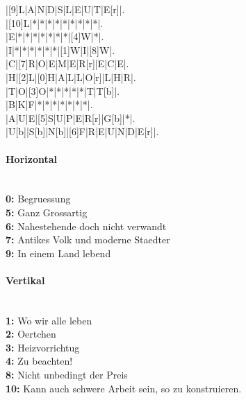 \begin{Puzzle}{10}{10}%
|[9]L|A|N|D|S|L|E|U|T|E[r]|.\\
|[10]L|*|*|*|*|*|*|*|*|*|.\\
|E|*|*|*|*|*|*|*|[4]W|*|.\\
|I|*|*|*|*|*|*|[1]W|I|[8]W|.\\
|C|[7]R|O|E|M|E|R[r]|E|C|E|.\\
|H|[2]L|[0]H|A|L|L|O[r]|L|H|R|.\\
|T|O|[3]O|*|*|*|*|*|T|T[b]|.\\
|B|K|F|*|*|*|*|*|*|*|.\\
|A|U|E|[5]S|U|P|E|R[r]|G[b]|*|.\\
|U[b]|S[b]|N[b]|[6]F|R|E|U|N|D|E[r]|.\\
\end{Puzzle}

\paragraph*{Horizontal}~\\
{\bfseries 0: }Begruessung\\
{\bfseries 5: }Ganz Grossartig\\
{\bfseries 6: }Nahestehende doch nicht verwandt\\
{\bfseries 7: }Antikes Volk und moderne Staedter\\
{\bfseries 9: }In einem Land lebend\\
\paragraph*{Vertikal}~\\
{\bfseries 1: }Wo wir alle leben\\
{\bfseries 2: }Oertchen\\
{\bfseries 3: }Heizvorrichtug\\
{\bfseries 4: }Zu beachten!\\
{\bfseries 8: }Nicht unbedingt der Preis\\
{\bfseries 10: }Kann auch schwere Arbeit sein, so zu konstruieren.\\

